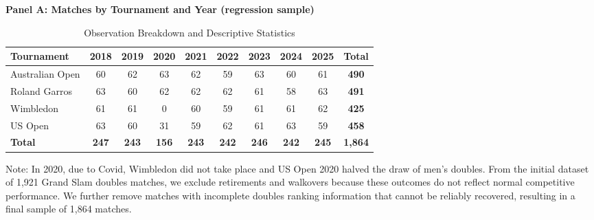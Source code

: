 \documentclass[10pt]{article}
\begin{document}
\begin{table}[h!]
\centering
\caption{Observation Breakdown and Descriptive Statistics}
\label{tab:t1}
\begin{threeparttable}
\textbf{Panel A: Matches by Tournament and Year (regression sample)}\\[2pt]
\begin{tabular}{lccccccccc}
\toprule
Tournament & 2018 & 2019 & 2020 & 2021 & 2022 & 2023 & 2024 & 2025 & \textbf{Total} \\
\midrule
Australian Open & 60 & 62 & 63 & 62 & 59 & 63 & 60 & 61 & \textbf{490} \\
Roland Garros    & 63 & 60 & 62 & 62 & 62 & 61 & 58 & 63 & \textbf{491} \\
Wimbledon        & 61 & 61 & 0  & 60 & 59 & 61 & 61 & 62 & \textbf{425} \\
US Open          & 63 & 60 & 31 & 59 & 62 & 61 & 63 & 59 & \textbf{458} \\
\midrule
\textbf{Total} & \textbf{247} & \textbf{243} & \textbf{156} & \textbf{243} & \textbf{242} & \textbf{246} & \textbf{242} & \textbf{245} & \textbf{1,864} \\
\bottomrule
\end{tabular}
\begin{tablenotes}
\small
\item Note: In 2020, due to Covid, Wimbledon  did not take place and US Open 2020 halved the draw of men's doubles. From the initial dataset of 1,921 Grand Slam doubles matches, we exclude retirements and walkovers because these outcomes do not reflect normal competitive performance. We further remove matches with incomplete doubles ranking information that cannot be reliably recovered, resulting in a final sample of 1,864 matches.
\end{tablenotes}


\end{threeparttable}
\end{table}
\end{document}
